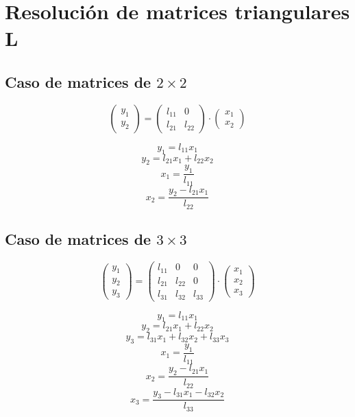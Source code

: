 \documentclass[10pt,a4paper,dvipdfmx]{article}
\begin{document}
\section{Resoluci\'on de matrices triangulares L}
\subsection{Caso de matrices de $2\times 2$ }
$$ \left( 
\begin{array}{c}
y_{1} \\
y_{2} 
 \end{array}
\right)
 = \left( 
\begin{array}{cc}
l_{{1}{1}} & 0 \\
l_{{2}{1}} & l_{{2}{2}} 
 \end{array}
\right)
 \cdot \left( 
\begin{array}{c}
x_{1} \\
x_{2} 
 \end{array}
\right)
 $$
\begin{multicols}{2}
$$ y_{1} = l_{{1}{1}} x_{1} $$
$$ y_{2} = l_{{2}{1}} x_{1} + l_{{2}{2}} x_{2} $$
\vfill\null
\columnbreak
$$ x_{1} = \dfrac{y_{1}}{l_{{1}{1}}} $$
$$ x_{2} = \dfrac{y_{2}- l_{{2}{1}} x_{1}}{l_{{2}{2}}} $$
\end{multicols}
\subsection{Caso de matrices de $3\times 3$ }
$$ \left( 
\begin{array}{c}
y_{1} \\
y_{2} \\
y_{3} 
 \end{array}
\right)
 = \left( 
\begin{array}{ccc}
l_{{1}{1}} & 0 & 0 \\
l_{{2}{1}} & l_{{2}{2}} & 0 \\
l_{{3}{1}} & l_{{3}{2}} & l_{{3}{3}} 
 \end{array}
\right)
 \cdot \left( 
\begin{array}{c}
x_{1} \\
x_{2} \\
x_{3} 
 \end{array}
\right)
 $$
\begin{multicols}{2}
$$ y_{1} = l_{{1}{1}} x_{1} $$
$$ y_{2} = l_{{2}{1}} x_{1} + l_{{2}{2}} x_{2} $$
$$ y_{3} = l_{{3}{1}} x_{1} + l_{{3}{2}} x_{2} + l_{{3}{3}} x_{3} $$
\vfill\null
\columnbreak
$$ x_{1} = \dfrac{y_{1}}{l_{{1}{1}}} $$
$$ x_{2} = \dfrac{y_{2}- l_{{2}{1}} x_{1}}{l_{{2}{2}}} $$
$$ x_{3} = \dfrac{y_{3}- l_{{3}{1}} x_{1}- l_{{3}{2}} x_{2}}{l_{{3}{3}}} $$
\end{multicols}
\end{document}
